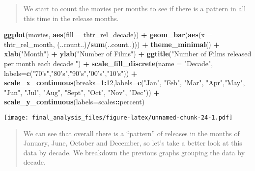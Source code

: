 \documentclass[]{article}
\newenvironment{Shaded}{\begin{snugshade}}{\end{snugshade}}
\newcommand{\KeywordTok}[1]{\textcolor[rgb]{0.13,0.29,0.53}{\textbf{#1}}}
\newcommand{\DataTypeTok}[1]{\textcolor[rgb]{0.13,0.29,0.53}{#1}}
\newcommand{\DecValTok}[1]{\textcolor[rgb]{0.00,0.00,0.81}{#1}}
\newcommand{\StringTok}[1]{\textcolor[rgb]{0.31,0.60,0.02}{#1}}
\newcommand{\OperatorTok}[1]{\textcolor[rgb]{0.81,0.36,0.00}{\textbf{#1}}}
\newcommand{\NormalTok}[1]{#1}
\begin{document}
\begin{quote}
We start to count the movies per months to see if there is a pattern in
all this time in the release months.
\end{quote}

\begin{Shaded}
\begin{Highlighting}[]
\KeywordTok{ggplot}\NormalTok{(movies, }\KeywordTok{aes}\NormalTok{(}\DataTypeTok{fill =}\NormalTok{ thtr_rel_decade)) }\OperatorTok{+}\StringTok{ }
\StringTok{  }\KeywordTok{geom_bar}\NormalTok{(}\KeywordTok{aes}\NormalTok{(}\DataTypeTok{x =}\NormalTok{ thtr_rel_month, (..count..)}\OperatorTok{/}\KeywordTok{sum}\NormalTok{(..count..))) }\OperatorTok{+}\StringTok{ }
\StringTok{  }\KeywordTok{theme_minimal}\NormalTok{() }\OperatorTok{+}
\StringTok{  }\KeywordTok{xlab}\NormalTok{(}\StringTok{"Month"}\NormalTok{) }\OperatorTok{+}\StringTok{ }
\StringTok{  }\KeywordTok{ylab}\NormalTok{(}\StringTok{"Number of Films"}\NormalTok{) }\OperatorTok{+}
\StringTok{  }\KeywordTok{ggtitle}\NormalTok{(}\StringTok{"Number of Films released per month each decade "}\NormalTok{) }\OperatorTok{+}\StringTok{ }
\StringTok{  }\KeywordTok{scale_fill_discrete}\NormalTok{(}\DataTypeTok{name =} \StringTok{"Decade"}\NormalTok{, }\DataTypeTok{labels=}\KeywordTok{c}\NormalTok{(}\StringTok{"70's"}\NormalTok{,}\StringTok{"80's"}\NormalTok{,}\StringTok{"90's"}\NormalTok{,}\StringTok{"00's"}\NormalTok{,}\StringTok{"10's"}\NormalTok{)) }\OperatorTok{+}\StringTok{ }
\StringTok{  }\KeywordTok{scale_x_continuous}\NormalTok{(}\DataTypeTok{breaks=}\DecValTok{1}\OperatorTok{:}\DecValTok{12}\NormalTok{,}\DataTypeTok{labels=}\KeywordTok{c}\NormalTok{(}\StringTok{"Jan"}\NormalTok{, }\StringTok{"Feb"}\NormalTok{, }\StringTok{"Mar"}\NormalTok{, }\StringTok{"Apr"}\NormalTok{,}\StringTok{"May"}\NormalTok{, }\StringTok{"Jun"}\NormalTok{, }\StringTok{"Jul"}\NormalTok{, }\StringTok{"Aug"}\NormalTok{, }\StringTok{"Sept"}\NormalTok{, }\StringTok{"Oct"}\NormalTok{, }\StringTok{"Nov"}\NormalTok{, }\StringTok{"Dec"}\NormalTok{)) }\OperatorTok{+}
\StringTok{  }\KeywordTok{scale_y_continuous}\NormalTok{(}\DataTypeTok{labels=}\NormalTok{scales}\OperatorTok{::}\NormalTok{percent)}
\end{Highlighting}
\end{Shaded}

\texttt{[image: final\_analysis\_files/figure-latex/unnamed-chunk-24-1.pdf]}

\begin{quote}
We can see that overall there is a ``pattern'' of releases in the months
of January, June, October and December, so let's take a better look at
this data by decade. We breakdown the previous graphs grouping the data
by decade.
\end{quote}
\end{document}
